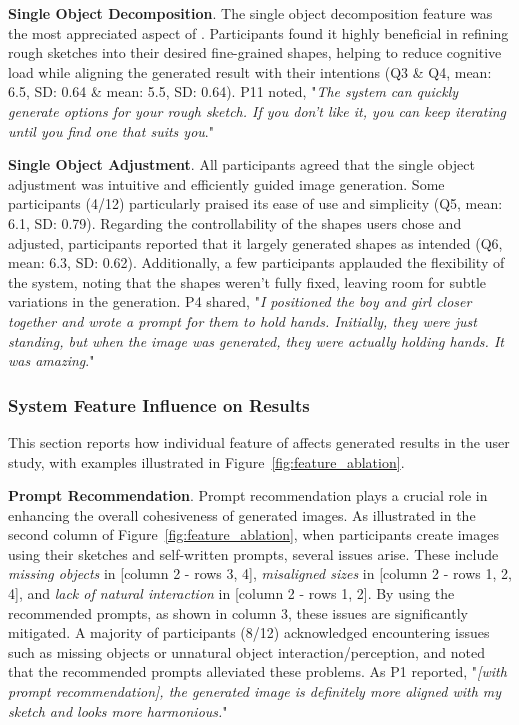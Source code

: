 \textbf{Single Object Decomposition}. 
The single object decomposition feature was the most appreciated aspect of \tool. 
Participants found it highly beneficial in refining rough sketches into their desired fine-grained shapes, helping to reduce cognitive load while aligning the generated result with their intentions (Q3 \& Q4, mean: 6.5, SD: 0.64 \& mean: 5.5, SD: 0.64). 
P11 noted, "\emph{The system can quickly generate options for your rough sketch. If you don’t like it, you can keep iterating until you find one that suits you}."

\textbf{Single Object Adjustment}. 
All participants agreed that the single object adjustment was intuitive and efficiently guided image generation. 
Some participants (4/12) particularly praised its ease of use and simplicity (Q5, mean: 6.1, SD: 0.79). 
Regarding the controllability of the shapes users chose and adjusted, participants reported that it largely generated shapes as intended (Q6, mean: 6.3, SD: 0.62).
Additionally, a few participants applauded the flexibility of the system, noting that the shapes weren’t fully fixed, leaving room for subtle variations in the generation. 
P4 shared, "\emph{I positioned the boy and girl closer together and wrote a prompt for them to hold hands. Initially, they were just standing, but when the image was generated, they were actually holding hands. It was amazing}."




\subsubsection{System Feature Influence on Results}
This section reports how individual feature of \tool affects generated results in the user study, with examples illustrated in Figure~\ref{fig:feature_ablation}.

\textbf{Prompt Recommendation}. Prompt recommendation plays a crucial role in enhancing the overall cohesiveness of generated images. 
As illustrated in the second column of Figure~\ref{fig:feature_ablation}, when participants create images using their sketches and self-written prompts, several issues arise. 
These include \textit{missing objects} in [column 2 - rows 3, 4], \textit{misaligned sizes} in [column 2 - rows 1, 2, 4], and \textit{lack of natural interaction} in [column 2 - rows 1, 2].
By using the recommended prompts, as shown in column 3, these issues are significantly mitigated. 
A majority of participants (8/12) acknowledged encountering issues such as missing objects or unnatural object interaction/perception, and noted that the recommended prompts alleviated these problems. 
As P1 reported, "\emph{[with prompt recommendation], the generated image is definitely more aligned with my sketch and looks more harmonious.}"


